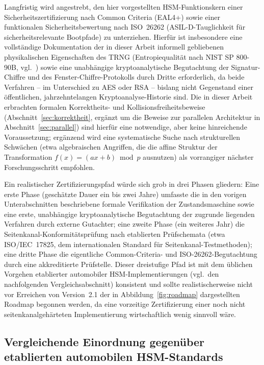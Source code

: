 ﻿\documentclass[a4paper,12pt]{article}
\theoremstyle{definition}
\begin{document}
Langfristig wird angestrebt, den hier vorgestellten HSM-Funktionskern einer Sicherheitszertifizierung nach Common Criteria (EAL4+) sowie einer funktionalen Sicherheitsbewertung nach ISO~26262 (ASIL-D-Tauglichkeit für sicherheitsrelevante Bootpfade) zu unterziehen. Hierfür ist insbesondere eine vollständige Dokumentation der in dieser Arbeit informell gebliebenen physikalischen Eigenschaften des TRNG (Entropiequalität nach NIST SP 800-90B, vgl.\ \cite{NIST90B}) sowie eine unabhängige kryptoanalytische Begutachtung der Signatur-Chiffre und des Fenster-Chiffre-Protokolls durch Dritte erforderlich, da beide Verfahren -- im Unterschied zu AES oder RSA -- bislang nicht Gegenstand einer öffentlichen, jahrzehntelangen Kryptoanalyse-Historie sind. Die in dieser Arbeit erbrachten formalen Korrektheits- und Kollisionsfreiheitsbeweise (Abschnitt~\ref{sec:korrektheit}, ergänzt um die Beweise zur parallelen Architektur in Abschnitt~\ref{sec:parallel}) sind hierfür eine notwendige, aber keine hinreichende Voraussetzung; ergänzend wird eine systematische Suche nach strukturellen Schwächen (etwa algebraischen Angriffen, die die affine Struktur der Transformation $f(x)=(ax+b)\bmod p$ ausnutzen) als vorrangiger nächster Forschungsschritt empfohlen.

Ein realistischer Zertifizierungspfad würde sich grob in drei Phasen gliedern: Eine erste Phase (geschätzte Dauer ein bis zwei Jahre) umfasste die in den vorigen Unterabschnitten beschriebene formale Verifikation der Zustandsmaschine sowie eine erste, unabhängige kryptoanalytische Begutachtung der zugrunde liegenden Verfahren durch externe Gutachter; eine zweite Phase (ein weiteres Jahr) die Seitenkanal-Konformitätsprüfung nach etablierten Prüfschemata (etwa ISO/IEC~17825, dem internationalen Standard für Seitenkanal-Testmethoden); eine dritte Phase die eigentliche Common-Criteria- und ISO-26262-Begutachtung durch eine akkreditierte Prüfstelle. Dieser dreistufige Pfad ist mit dem üblichen Vorgehen etablierter automobiler HSM-Implementierungen (vgl.\ den nachfolgenden Vergleichsabschnitt) konsistent und sollte realistischerweise nicht vor Erreichen von Version~2.1 der in Abbildung~\ref{fig:roadmap} dargestellten Roadmap begonnen werden, da eine vorzeitige Zertifizierung einer noch nicht seitenkanalgehärteten Implementierung wirtschaftlich wenig sinnvoll wäre.

\subsection{Vergleichende Einordnung gegenüber etablierten automobilen HSM-Standards}
\label{sec:ausblick-vergleich}
\end{document}
